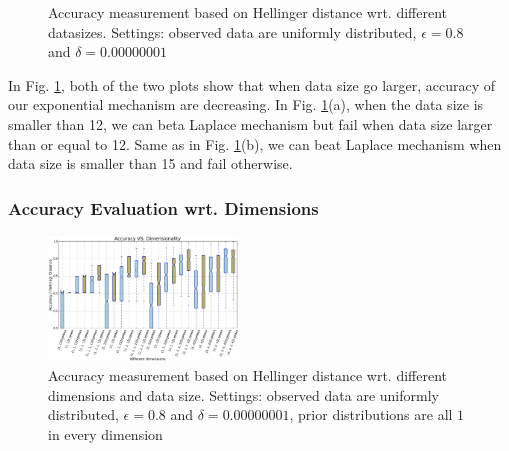 \documentclass[sigconf, anonymous]{acmart}
\begin{document}
\begin{figure}[ht]
\begin{center}
\centering
\caption{Accuracy measurement based on Hellinger distance wrt. different datasizes. Settings: observed data are uniformly distributed, $\epsilon = 0.8$ and $\delta = 0.00000001$}
\label{fig_vs_datasize}
\end{center}
\end{figure}

In Fig. \ref{fig_vs_datasize}, both of the two plots show that when data size go larger, accuracy of our exponential mechanism are decreasing. In Fig. \ref{fig_vs_datasize}(a), when the data size is smaller than 12, we can beta Laplace mechanism but fail when data size larger than or equal to 12. Same as in Fig. \ref{fig_vs_datasize}(b), we can beat Laplace mechanism when data size is smaller than 15 and fail otherwise.

\subsubsection{Accuracy Evaluation wrt. Dimensions}
\label{subsubsec_vs_dimension}


\begin{figure}[ht]
\centering
\includegraphics[width=0.45\textwidth]{accuracy_vs_dimension.eps}
\caption{Accuracy measurement based on Hellinger distance wrt. different dimensions and data size. Settings: observed data are uniformly distributed, $\epsilon = 0.8$ and $\delta = 0.00000001$, prior distributions are all $1$ in every dimension}
\label{fig_vs_dimension}
\end{figure}
\end{document}
